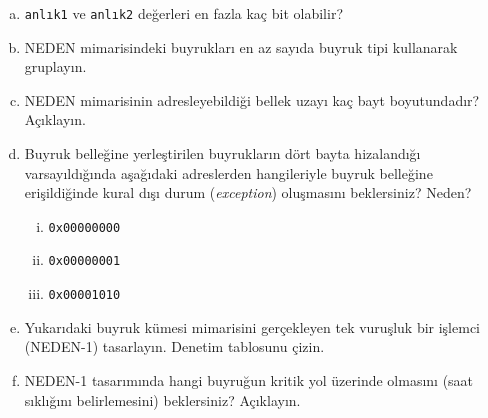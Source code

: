 \begin{alistirma}[\zor]
\begin{enumerate}[(a)]
    \item \texttt{anlık1} ve \texttt{anlık2} değerleri en fazla kaç bit olabilir?
    \item NEDEN mimarisindeki buyrukları en az sayıda buyruk tipi kullanarak gruplayın.
    \item NEDEN mimarisinin adresleyebildiği bellek uzayı kaç bayt boyutundadır? Açıklayın.
    \item Buyruk belleğine yerleştirilen buyrukların dört bayta hizalandığı varsayıldığında aşağıdaki adreslerden hangileriyle buyruk belleğine erişildiğinde kural dışı durum (\emph{exception}) oluşmasını beklersiniz? Neden?
    \begin{enumerate}[(i)]
        \item \texttt{0x00000000}
        \item \texttt{0x00000001}
        \item \texttt{0x00001010}
    \end{enumerate}
    \item Yukarıdaki buyruk kümesi mimarisini gerçekleyen tek vuruşluk bir işlemci (NEDEN-1) tasarlayın. Denetim tablosunu çizin.
    \item NEDEN-1 tasarımında hangi buyruğun kritik yol üzerinde olmasını (saat sıklığını belirlemesini) beklersiniz? Açıklayın.
\end{enumerate}
\end{alistirma}

